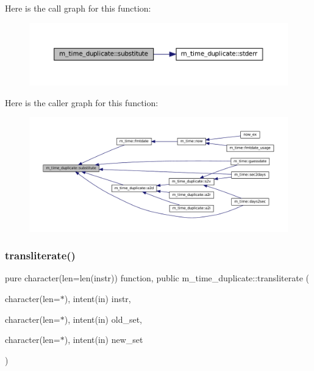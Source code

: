 Here is the call graph for this function\+:\nopagebreak
\begin{figure}[H]
\begin{center}
\leavevmode
\includegraphics[width=350pt]{namespacem__time__duplicate_abc203f3a6afc1edeecbcdc58b187a5d5_cgraph}
\end{center}
\end{figure}
Here is the caller graph for this function\+:\nopagebreak
\begin{figure}[H]
\begin{center}
\leavevmode
\includegraphics[width=350pt]{namespacem__time__duplicate_abc203f3a6afc1edeecbcdc58b187a5d5_icgraph}
\end{center}
\end{figure}
\mbox{\label{namespacem__time__duplicate_ac8388a45881cf7c2f9047b4d643ed3f2}} 
\subsubsection{\texorpdfstring{transliterate()}{transliterate()}}
{\footnotesize\ttfamily pure character(len=len(instr)) function, public m\+\_\+time\+\_\+duplicate\+::transliterate (\begin{DoxyParamCaption}\item[{character(len=$\ast$), intent(in)}]{instr,  }\item[{character(len=$\ast$), intent(in)}]{old\+\_\+set,  }\item[{character(len=$\ast$), intent(in)}]{new\+\_\+set }\end{DoxyParamCaption})}



